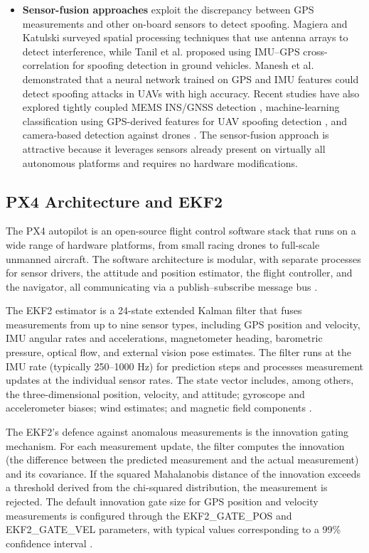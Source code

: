\documentclass[electronics,article,accept,moreauthors]{Definitions/mdpi}
\begin{document}
\begin{itemize}
\item \textbf{Sensor-fusion approaches} exploit the discrepancy between GPS measurements and other on-board sensors to detect spoofing. Magiera and Katulski \citep{magiera2015} surveyed spatial processing techniques that use antenna arrays to detect interference, while Tanil et al. \citep{tanil2018} proposed using IMU--GPS cross-correlation for spoofing detection in ground vehicles. Manesh et al. \citep{manesh2019} demonstrated that a neural network trained on GPS and IMU features could detect spoofing attacks in UAVs with high accuracy. Recent studies have also explored tightly coupled MEMS INS/GNSS detection \citep{gao2020}, machine-learning classification using GPS-derived features for UAV spoofing detection \citep{mohammad2023}, and camera-based detection against drones \citep{davidovich2022}. The sensor-fusion approach is attractive because it leverages sensors already present on virtually all autonomous platforms and requires no hardware modifications.
  
\end{itemize}

\subsection{PX4 Architecture and EKF2}
\label{sec:px4architecture}

The PX4 autopilot is an open-source flight control software stack that runs on a wide range of hardware platforms, from small racing drones to full-scale unmanned aircraft. The software architecture is modular, with separate processes for sensor drivers, the attitude and position estimator, the flight controller, and the navigator, all communicating via a publish--subscribe message bus \citep{px4docs}.

The EKF2 estimator is a 24-state extended Kalman filter that fuses measurements from up to nine sensor types, including GPS position and velocity, IMU angular rates and accelerations, magnetometer heading, barometric pressure, optical flow, and external vision pose estimates. The filter runs at the IMU rate (typically 250--1000 Hz) for prediction steps and processes measurement updates at the individual sensor rates. The state vector includes, among others, the three-dimensional position, velocity, and attitude; gyroscope and accelerometer biases; wind estimates; and magnetic field components \citep{px4docs}.

The EKF2's defence against anomalous measurements is the innovation gating mechanism. For each measurement update, the filter computes the innovation (the difference between the predicted measurement and the actual measurement) and its covariance. If the squared Mahalanobis distance of the innovation exceeds a threshold derived from the chi-squared distribution, the measurement is rejected. The default innovation gate size for GPS position and velocity measurements is configured through the EKF2\_GATE\_POS and EKF2\_GATE\_VEL parameters, with typical values corresponding to a 99\% confidence interval \citep{px4docs}.
\end{document}
